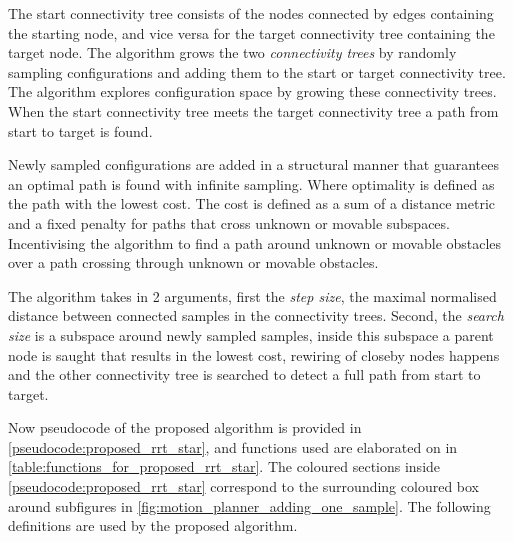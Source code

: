 The start connectivity tree consists of the nodes connected by edges containing the starting node, and vice versa for the target connectivity tree containing the target node. The algorithm grows the two \textit{connectivity trees} by randomly sampling configurations and adding them to the start or target connectivity tree. The algorithm explores configuration space by growing these connectivity trees. When the start connectivity tree meets the target connectivity tree a path from start to target is found.\bs

Newly sampled configurations are added in a structural manner that guarantees an optimal path is found with infinite sampling. Where optimality is defined as the path with the lowest cost. The cost is defined as a sum of a distance metric and a fixed penalty for paths that cross unknown or movable subspaces. Incentivising the algorithm to find a path around unknown or movable obstacles over a path crossing through unknown or movable obstacles.\bs

The algorithm takes in 2 arguments, first the \textit{step size}, the maximal normalised distance between connected samples in the connectivity trees. Second, the \textit{search size} is a subspace around newly sampled samples, inside this subspace a parent node is saught that results in the lowest cost, rewiring of closeby nodes happens and the other connectivity tree is searched to detect a full path from start to target.\bs

Now pseudocode of the proposed algorithm is provided in \cref{pseudocode:proposed_rrt_star}, and functions used are elaborated on in \cref{table:functions_for_proposed_rrt_star}. The coloured sections inside \cref{pseudocode:proposed_rrt_star} correspond to the surrounding coloured box around subfigures in \cref{fig:motion_planner_adding_one_sample}. The following definitions are used by the proposed algorithm.\bs



